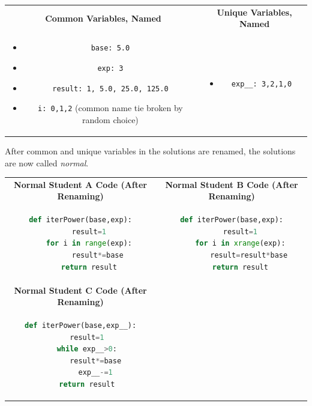 \begin{tabular}{cc}
{\bf Common Variables, Named} & {\bf Unique Variables, Named} \\
\begin{minipage}{0.5\linewidth}
\begin{itemize}
\item \texttt{base: 5.0} 
\item \texttt{exp: 3} 
\item \texttt{result: 1, 5.0, 25.0, 125.0}
\item \texttt{i: 0,1,2} (common name tie broken by random choice)
\end{itemize}
\end{minipage}
&
\begin{minipage}{0.5\linewidth}
\begin{itemize}
\item \begin{verbatim} exp__: 3,2,1,0 \end{verbatim}
\end{itemize}
\end{minipage}

\end{tabular}

After common and unique variables in the solutions are renamed, the solutions are now called {\it normal}.

\begin{tabular}{cc}

{\bf Normal Student A Code (After Renaming)} & {\bf Normal Student B Code (After Renaming)} \\ 

\begin{minipage}{0.5\linewidth}
\begin{lstlisting}[language=python]
def iterPower(base,exp):
    result=1
    for i in range(exp):
        result*=base
    return result
\end{lstlisting}
\end{minipage} &
\begin{minipage}{0.5\linewidth}
\begin{lstlisting}[language=python]
def iterPower(base,exp):
    result=1
    for i in xrange(exp):
        result=result*base
    return result
\end{lstlisting}
\end{minipage}
\\
{\bf Normal Student C Code (After Renaming)} &  \\
\begin{minipage}{0.5\linewidth}
\begin{lstlisting}[language=python]
def iterPower(base,exp__):
   result=1
   while exp__>0:
       result*=base
       exp__-=1
   return result
\end{lstlisting}
\end{minipage}
& \\
\end{tabular}



